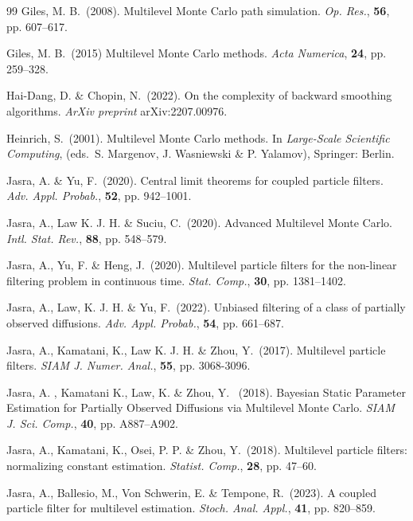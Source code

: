 \documentclass[english]{article}
\begin{document}
\begin{thebibliography}{99}
{\sc Giles}, M. B.~(2008). Multilevel Monte Carlo path simulation. \emph{Op. Res.}, {\bf 56}, pp. 607--617.

{\sc Giles}, M. B.~(2015)  Multilevel Monte Carlo methods. \emph{Acta Numerica}, {\bf 24}, pp. 259--328.

{\sc Hai-Dang}, D. \& {\sc Chopin}, N.~(2022).
On the complexity of backward smoothing algorithms. \emph{ArXiv preprint} arXiv:2207.00976.


{\sc Heinrich}, S.~(2001).
{Multilevel {Mo}nte {C}arlo methods}.
In \emph{Large-Scale Scientific Computing}, (eds.~S. Margenov, J. Wasniewski \&
P. Yalamov), Springer: Berlin.


{\sc Jasra}, A. \& {\sc Yu}, F.~(2020). 
Central limit theorems for coupled particle filters. \emph{Adv. Appl. Probab.}, {\bf 52}, pp. 942--1001.

{\sc Jasra}, A., {\sc Law} K. J. H. \& {\sc Suciu}, C.~(2020).  Advanced Multilevel Monte Carlo. \emph{Intl. Stat. Rev.}, {\bf 88}, pp. 548--579.


{\sc Jasra}, A., {\sc Yu}, F. \& {\sc Heng}, J.~(2020). Multilevel particle filters for the non-linear filtering problem in 
continuous time. \emph{Stat. Comp.}, {\bf 30}, pp. 1381--1402.

{\sc Jasra}, A., {\sc Law}, K. J. H. \& {\sc Yu}, F.~(2022). Unbiased filtering of a class of partially observed diffusions.
\emph{Adv. Appl. Probab.}, {\bf 54}, pp. 661--687.


{\sc Jasra}, A., {\sc Kamatani}, K., {\sc Law} K. J. H. \& {\sc Zhou}, Y.~(2017). 
Multilevel particle filters. \emph{SIAM J. Numer. Anal.}, {\bf 55}, pp. 3068-3096.

{\sc Jasra}, A. ,  {\sc Kamatani} K.,  {\sc Law},  K.  \& {\sc Zhou}, Y. ~(2018).
Bayesian Static Parameter Estimation for Partially Observed Diffusions via Multilevel Monte Carlo.
\emph{SIAM J.  Sci.  Comp.},  {\bf 40},  pp. A887--A902.

{\sc Jasra}, A., {\sc Kamatani}, K., {\sc Osei}, P. P. \& {\sc Zhou}, Y.~(2018). Multilevel particle filters: normalizing constant estimation.
\emph{Statist. Comp.}, {\bf 28}, pp. 47--60.

{\sc Jasra}, A., {\sc Ballesio}, M., {\sc Von Schwerin}, E. \& {\sc Tempone}, R.~(2023).
A coupled particle filter for multilevel estimation. \emph{Stoch. Anal. Appl.}, {\bf 41}, pp. 820--859.


\end{thebibliography}
\end{document}
